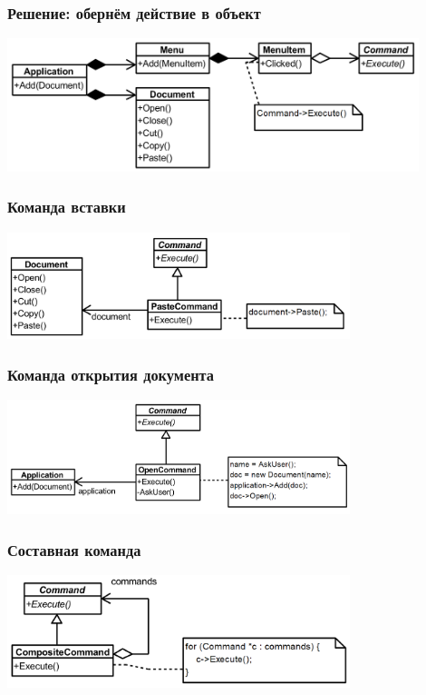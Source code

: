 \documentclass[xetex,mathserif,serif]{beamer}
\begin{document}
    \begin{frame}
        \frametitle{Решение: обернём действие в объект}
        \begin{center}
            \includegraphics[width=0.9\textwidth]{commandExample.png}
        \end{center}
    \end{frame}

    \begin{frame}
        \frametitle{Команда вставки}
        \begin{center}
            \includegraphics[width=0.75\textwidth]{pasteCommand.png}
        \end{center}
    \end{frame}

    \begin{frame}
        \frametitle{Команда открытия документа}
        \begin{center}
            \includegraphics[width=0.75\textwidth]{openDocumentCommand.png}
        \end{center}
    \end{frame}

    \begin{frame}
        \frametitle{Составная команда}
        \begin{center}
            \includegraphics[width=0.75\textwidth]{compositeCommand.png}
        \end{center}
    \end{frame}
\end{document}
